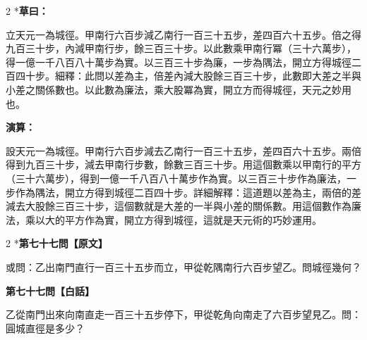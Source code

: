 \documentclass[11pt,a4paper]{article}
\begin{document}
\begin{paracol}{2}
\switchcolumn[0]*\textbf{草曰：}

\small 立天元一為城徑。甲南行六百步減乙南行一百三十五步，差四百六十五步。倍之得九百三十步，內減甲南行步，餘三百三十步。以此數乘甲南行冪（三十六萬步），得一億一千八百八十萬步為實。以三百三十步為廉，一步為隅法，開立方得城徑二百四十步。細釋：此問以差為主，倍差內減大股餘三百三十步，此數即大差之半與小差之關係數也。以此數為廉法，乘大股冪為實，開立方而得城徑，天元之妙用也。

\switchcolumn\textbf{演算：}

\small 設天元一為城徑。甲南行六百步減去乙南行一百三十五步，差四百六十五步。兩倍得到九百三十步，減去甲南行步數，餘數三百三十步。用這個數乘以甲南行的平方（三十六萬步），得到一億一千八百八十萬步作為實。以三百三十步作為廉法，一步作為隅法，開立方得到城徑二百四十步。詳細解釋：這道題以差為主，兩倍的差減去大股餘三百三十步，這個數就是大差的一半與小差的關係數。用這個數作為廉法，乘以大的平方作為實，開立方得到城徑，這就是天元術的巧妙運用。
\end{paracol}

\vspace{0.1cm}
\noindent{}
\par\vspace{0.3cm}

\begin{paracol}{2}
\switchcolumn[0]*\noindent\textbf{第七十七問【原文】}

\small 或問：乙出南門直行一百三十五步而立，甲從乾隅南行六百步望乙。問城徑幾何？

\switchcolumn\noindent\textbf{第七十七問【白話】}

\small 乙從南門出來向南直走一百三十五步停下，甲從乾角向南走了六百步望見乙。問：圓城直徑是多少？
\end{paracol}

\vspace{0.1cm}
\noindent{}
\par\vspace{0.15cm}
\end{document}
